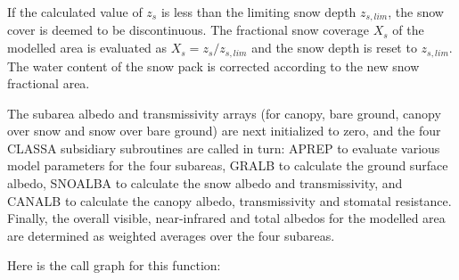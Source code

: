 If the calculated value of $z_s$ is less than the limiting snow depth $z_{s,lim}$, the snow cover is deemed to be discontinuous. The fractional snow coverage $X_s$ of the modelled area is evaluated as $ X_s = z_s / z_{s,lim} $ and the snow depth is reset to $z_{s,lim}$. The water content of the snow pack is corrected according to the new snow fractional area.

The subarea albedo and transmissivity arrays (for canopy, bare ground, canopy over snow and snow over bare ground) are next initialized to zero, and the four C\+L\+A\+S\+S\+A subsidiary subroutines are called in turn\+: A\+P\+R\+E\+P to evaluate various model parameters for the four subareas, G\+R\+A\+L\+B to calculate the ground surface albedo, S\+N\+O\+A\+L\+B\+A to calculate the snow albedo and transmissivity, and C\+A\+N\+A\+L\+B to calculate the canopy albedo, transmissivity and stomatal resistance. Finally, the overall visible, near-\/infrared and total albedos for the modelled area are determined as weighted averages over the four subareas.

Here is the call graph for this function\+:


